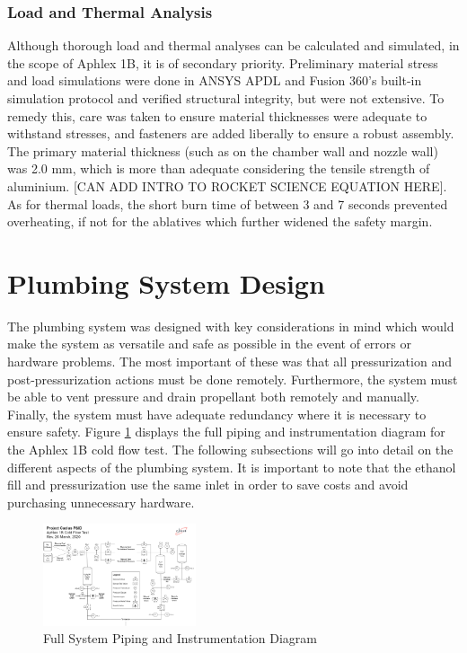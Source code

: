 \documentclass[9pt]{article} %
\numberwithin{equation}{section} %
\begin{document}
\subsubsection{Load and Thermal Analysis}

\hspace{\parindent} Although thorough load and thermal analyses can be calculated and simulated, in the scope of Aphlex 1B, it is of secondary priority. Preliminary material stress and load simulations were done in ANSYS APDL and Fusion 360's built-in simulation protocol and verified structural integrity, but were not extensive. To remedy this, care was taken to ensure material thicknesses were adequate to withstand stresses, and fasteners are added liberally to ensure a robust assembly. The primary material thickness (such as on the chamber wall and nozzle wall) was 2.0 mm, which is more than adequate considering the tensile strength of aluminium. [CAN ADD INTRO TO ROCKET SCIENCE EQUATION HERE]. As for thermal loads, the short burn time of between 3 and 7 seconds prevented overheating, if not for the ablatives which further widened the safety margin.

\section{Plumbing System Design}
The plumbing system was designed with key considerations in mind which would make the system as versatile and safe as possible in the event of errors or hardware problems. The most important of these was that all pressurization and post-pressurization actions must be done remotely. Furthermore, the system must be able to vent pressure and drain propellant both remotely and manually. Finally, the system must have adequate redundancy where it is necessary to ensure safety. Figure \ref{fig:piping_and_instrumentation_diagram} displays the full piping and instrumentation diagram for the Aphlex 1B cold flow test. The following subsections will go into detail on the different aspects of the plumbing system. It is important to note that the ethanol fill and pressurization use the same inlet in order to save costs and avoid purchasing unnecessary hardware.

\begin{figure}[!htb]
    \centering
    \includegraphics[scale=0.5, width=0.4\textwidth, trim={0cm 0cm 0cm 5cm}, clip]{pid} %
    \caption{Full System Piping and Instrumentation Diagram}
    \label{fig:piping_and_instrumentation_diagram}
\end{figure}
\end{document}
